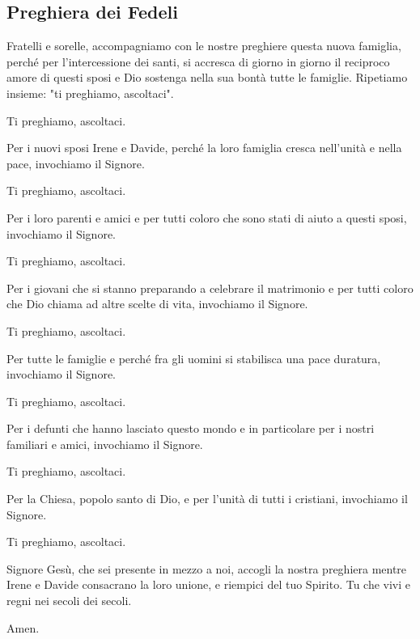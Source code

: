 
\subsection*{Preghiera dei Fedeli}

	\begin{dialoghi}
		\item[\sacerdote] Fratelli e sorelle, accompagniamo con le nostre preghiere questa nuova famiglia, perché per l'intercessione dei santi, si accresca di giorno in giorno il reciproco amore di questi sposi e Dio sostenga nella sua bontà tutte le famiglie. Ripetiamo insieme: "ti preghiamo, ascoltaci".
		\item[\assemblea] Ti preghiamo, ascoltaci.
		\item[\lettore] Per i nuovi sposi Irene e Davide, perché la loro famiglia cresca nell'unità e nella pace, invochiamo il Signore.
		\item[\assemblea] Ti preghiamo, ascoltaci.
		\item[\lettore] Per i loro parenti e amici e per tutti coloro che sono stati di aiuto a questi sposi, invochiamo il Signore.
		\item[\assemblea] Ti preghiamo, ascoltaci.
		\item[\lettore] Per i giovani che si stanno preparando a celebrare il matrimonio e per tutti coloro che Dio chiama ad altre scelte di vita, invochiamo il Signore.
		\item[\assemblea] Ti preghiamo, ascoltaci.
		\item[\lettore] Per tutte le famiglie e perché fra gli uomini si stabilisca una pace duratura, invochiamo il Signore.
		\item[\assemblea] Ti preghiamo, ascoltaci.
		\item[\lettore] Per i defunti che hanno lasciato questo mondo e in particolare per i nostri familiari e amici, invochiamo il Signore.
		\item[\assemblea] Ti preghiamo, ascoltaci.
		\item[\lettore] Per la Chiesa, popolo santo di Dio, e per l'unità di tutti i cristiani, invochiamo il Signore.
		\item[\assemblea] Ti preghiamo, ascoltaci.
		\item[\sacerdote] Signore Gesù, che sei presente in mezzo a noi, accogli la nostra preghiera mentre Irene e Davide consacrano la loro unione, e riempici del tuo Spirito. Tu che vivi e regni nei secoli dei secoli.
		\item[\assemblea] Amen.
	\end{dialoghi}

